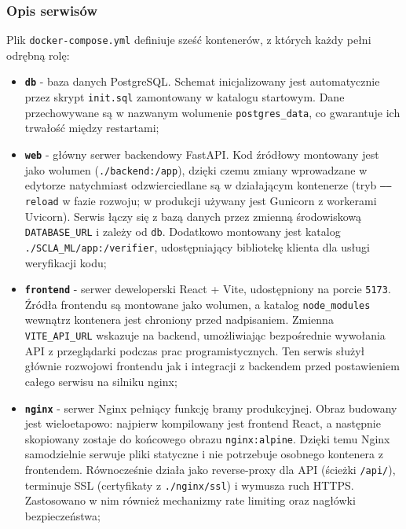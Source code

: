 \documentclass[12pt,a4paper]{article}
\begin{document}
\subsubsection{Opis serwisów}
Plik \texttt{docker-compose.yml} definiuje sześć kontenerów, z których każdy pełni odrębną rolę:

\begin{itemize}
    \item \textbf{\texttt{db}} - baza danych PostgreSQL. Schemat inicjalizowany jest automatycznie przez skrypt \texttt{init.sql} zamontowany w katalogu startowym. Dane przechowywane są w nazwanym wolumenie \texttt{postgres\_data}, co gwarantuje ich trwałość między restartami;
    
    \item \textbf{\texttt{web}} - główny serwer backendowy FastAPI. Kod źródłowy montowany jest jako wolumen (\texttt{./backend:/app}), dzięki czemu zmiany wprowadzane w edytorze natychmiast odzwierciedlane są w działającym kontenerze (tryb \texttt{––reload} w fazie rozwoju; w produkcji używany jest Gunicorn z workerami Uvicorn). Serwis łączy się z bazą danych przez zmienną środowiskową \texttt{DATABASE\_URL} i zależy od \texttt{db}. Dodatkowo montowany jest katalog \texttt{./SCLA\_ML/app:/verifier}, udostępniający bibliotekę klienta dla usługi weryfikacji kodu;
    
    \item \textbf{\texttt{frontend}} - serwer deweloperski React + Vite, udostępniony na porcie \texttt{5173}. Źródła frontendu są montowane jako wolumen, a katalog \texttt{node\_modules} wewnątrz kontenera jest chroniony przed nadpisaniem. Zmienna \texttt{VITE\_API\_URL} wskazuje na backend, umożliwiając bezpośrednie wywołania API z przeglądarki podczas prac programistycznych. Ten serwis służył głównie rozwojowi frontendu jak i integracji z backendem przed postawieniem całego serwisu na silniku nginx;
    
    \item \textbf{\texttt{nginx}} - serwer Nginx pełniący funkcję bramy produkcyjnej. Obraz budowany jest wieloetapowo: najpierw kompilowany jest frontend React, a następnie skopiowany zostaje do końcowego obrazu \texttt{nginx:alpine}. Dzięki temu Nginx samodzielnie serwuje pliki statyczne i nie potrzebuje osobnego kontenera z frontendem. Równocześnie działa jako reverse-proxy dla API (ścieżki \texttt{/api/}), terminuje SSL (certyfikaty z \texttt{./nginx/ssl}) i wymusza ruch HTTPS. Zastosowano w nim również mechanizmy rate limiting oraz nagłówki bezpieczeństwa;
    

\end{itemize}
\end{document}
